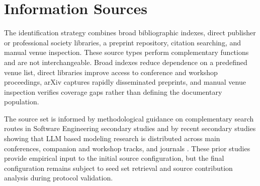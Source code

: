 \section{Information Sources}
\label{sec:protocol_sources}

The identification strategy combines broad bibliographic indexes, direct publisher or professional society libraries, a preprint repository, citation searching, and manual venue inspection. These source types perform complementary functions and are not interchangeable. Broad indexes reduce dependence on a predefined venue list, direct libraries improve access to conference and workshop proceedings, arXiv captures rapidly disseminated preprints, and manual venue inspection verifies coverage gaps rather than defining the documentary population.

The source set is informed by methodological guidance on complementary search routes in Software Engineering secondary studies \cite{Brereton2007Lessons,Zhang2011Identifying,Wohlin2014Snowballing} and by recent secondary studies showing that LLM based modeling research is distributed across main conferences, companion and workshop tracks, and journals \cite{Zhang2027LLMMDE,Rahmanian2026Diagrams}. These prior studies provide empirical input to the initial source configuration, but the final configuration remains subject to seed set retrieval and source contribution analysis during protocol validation.

